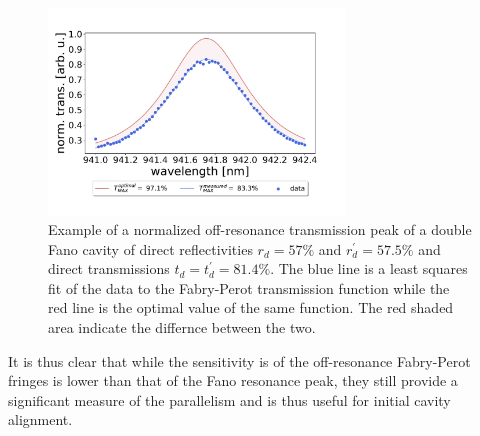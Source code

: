 \begin{figure}[h!]
    \centering
    \includegraphics[width=0.7\textwidth]{figures/parallelism_plot.pdf}
    \caption{Example of a normalized off-resonance transmission peak of a double Fano cavity of direct reflectivities $r_d = 57\%$ and $r_d^{\prime}=57.5\%$ and direct transmissions $t_d = t_d^{\prime} = 81.4\%$. The blue line is a least squares fit of the data to the Fabry-Perot transmission function while the red line is the optimal value of the same function. The red shaded area indicate the differnce between the two.}
    \label{fig:parallelism_plot}
\end{figure}

It is thus clear that while the sensitivity is of the off-resonance Fabry-Perot fringes is lower than that of the Fano resonance peak, they still provide a significant measure of the parallelism and is thus useful for initial cavity alignment.
